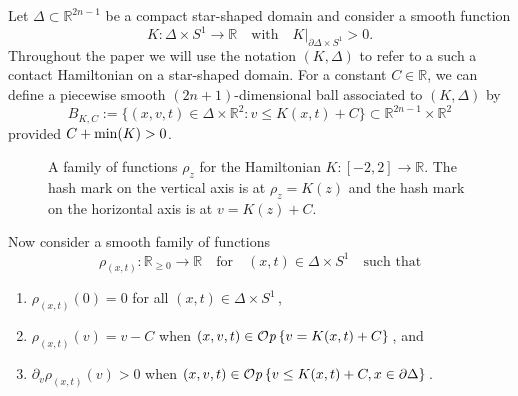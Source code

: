 \documentclass[12pt]{paper}
\theoremstyle{plain}
\theoremstyle{definition}
\newcommand{\p}{\partial}
\newcommand{\R}{{\mathbb{R}}}
\renewcommand{\min}{{\rm min}}
\newcommand{\CCont}{\mathrm{Cont}}
\def\Op{{\mathcal O}{\it p}\,}
\numberwithin{figure}{section}
\begin{document}
Let $\Delta \subset \R^{2n-1}$ be a compact star-shaped domain and consider a smooth function
\begin{equation}\label{e:KBoundary}
	K: \Delta \times S^1 \to \R \quad\mbox{with}\quad K|_{\partial \Delta \times S^1} > 0.
\end{equation}
Throughout the paper we will use the notation $(K, \Delta)$ to refer to a such a contact Hamiltonian 
on a star-shaped domain.
For a constant $C \in \R$, we can define a piecewise smooth $(2n+1)$-dimensional ball associated to $(K, \Delta)$ by
\begin{equation}\label{e:S1ball}
	B_{K,C} := \{(x,v,t) \in \Delta \times \R^2 : v \leq K(x,t)+C\} \subset \R^{2n-1} \times \R^2
\end{equation}
provided $C + \min(K) > 0$.
\begin{figure}[h]
   \centering
   \def\svgwidth{400pt}
   
   \caption{A family of functions $\rho_z$ for the Hamiltonian $K: [-2,2] \to \R$.
   The hash mark on the vertical axis is at $\rho_z = K(z)$ and the hash mark on the horizontal axis is at $v = K(z) + C$.}
   \label{f:Rho}
  \label{f:embedHamiltonian2a}
\end{figure}
Now consider a smooth family of functions
\begin{equation}\label{e:FamilyRhoS1}
	\rho_{(x,t)}: \R_{\geq 0} \to \R \quad\mbox{for}\quad (x,t) \in \Delta \times S^1 \quad\mbox{such that}
\end{equation}
\begin{enumerate}
\item $\rho_{(x,t)}(0) = 0$ for all $(x,t) \in \Delta \times S^1$\,,
\item $\rho_{(x,t)}(v) = v - C$ when $(x,v,t) \in \Op\{v = K(x,t) +C\}$\,, and
\item $\p_v \rho_{(x,t)}(v) > 0$ when $(x,v,t) \in \Op\{v \leq K(x,t) + C, x \in \p\Delta\}$\,.
\end{enumerate}
\end{document}
